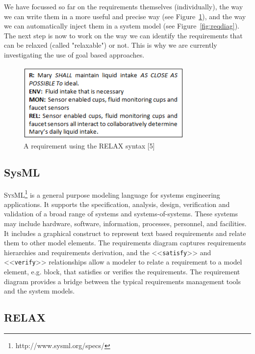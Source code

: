 \documentclass[10pt, conference, compsocconf]{IEEEtran}
\def\sysml{\textsc{SysML}}
\newcommand{\Myfig}[1]{Figure~\ref{fig:#1}}
\newcommand{\stereotype}[1]{\textless\textless\texttt{#1}\textgreater\textgreater}
\begin{document}
We have focussed so far on the requirements themselves (individually), the way we can write them in a more useful and precise way (see \Myfig{relaxreq}), and the way we can automatically inject them in a system model (see \Myfig{reqdiag}).
The next step is now to work on the way we can identify the requirements that can be relaxed (called "relaxable") or not.
This is why we are currently investigating the use of goal based approaches.

\begin{figure}[!t]
\centering
\includegraphics[width=3.4in]{fig15}
\caption{A requirement using the RELAX syntax [5]}
\label{fig:relaxreq}
\end{figure}

\subsection{SysML}


\sysml{}\footnote{http://www.sysml.org/specs/} is a general purpose modeling language for systems engineering applications. It supports the specification, analysis, design, verification and validation of a broad range of systems and systems-of-systems. These systems may include hardware, software, information, processes, personnel, and facilities. It includes a graphical construct to represent text based requirements and relate them to other model elements. The requirements diagram captures requirements hierarchies and requirements derivation, and the \stereotype{satisfy} and \stereotype{verify} relationships allow a modeler to relate a requirement to a model element, e.g. block, that satisfies or verifies the requirements. The requirement diagram provides a bridge between the typical requirements management tools and the system models.

\subsection{RELAX}
\end{document}
